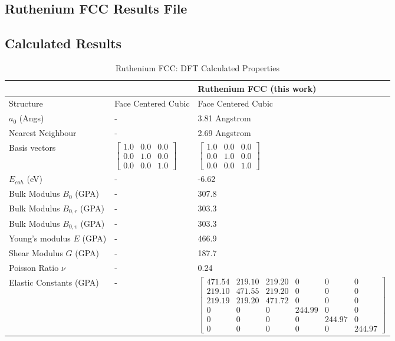 \clearpage
\FloatBarrier
\subsection{Ruthenium FCC Results File}






\subsection{Calculated Results}

\renewcommand{\arraystretch}{1.7}
\begin{table}[ht]
\renewcommand{\arraystretch}{1.2}
\begin{tabular}{lll}
\hline\hline
& & Ruthenium FCC (this work)  \\
\hline\hline
Structure                    & Face Centered Cubic & Face Centered Cubic  \\
$a_0$ (Angs)                 & - & 3.81 Angstrom \\
Nearest Neighbour            & - & 2.69 Angstrom \\
Basis vectors                & $\begin{bmatrix} 1.0 & 0.0 & 0.0 \\ 0.0 & 1.0 & 0.0 \\ 0.0 & 0.0 & 1.0 \end{bmatrix}$ & $\begin{bmatrix} 1.0 & 0.0 & 0.0 \\ 0.0 & 1.0 & 0.0 \\ 0.0 & 0.0 & 1.0 \end{bmatrix}$ \\
$E_{coh}$ (eV)               & - & -6.62  \\
Bulk Modulus $B_0$ (GPA)     & - & 307.8   \\
Bulk Modulus $B_{0,r}$ (GPA) & - & 303.3 \\
Bulk Modulus $B_{0,v}$ (GPA) & - & 303.3 \\
Young's modulus $E$ (GPA)    & - & 466.9   \\
Shear Modulus $G$ (GPA)      & - & 187.7  \\
Poisson Ratio $\nu$          & - & 0.24   \\
Elastic Constants (GPA)      & - & $\begin{bmatrix} 471.54 & 219.10 & 219.20 & 0 & 0 & 0 \\ 219.10 & 471.55 & 219.20 & 0 & 0 & 0 \\ 219.19 & 219.20 & 471.72 & 0 & 0 & 0 \\ 0 & 0 & 0 & 244.99 & 0 & 0 \\ 0 & 0 & 0 & 0 & 244.97 & 0 \\ 0 & 0 & 0 & 0 & 0 & 244.97 \end{bmatrix}$ \\
\hline\hline
\end{tabular}
\caption{Ruthenium FCC: DFT Calculated Properties}
\label{table:rufccexperimentaldft}
\end{table}






